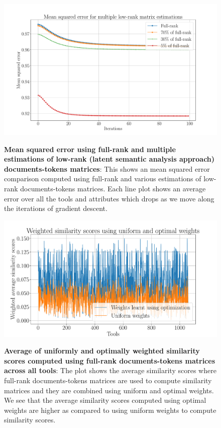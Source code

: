 \begin{figure}[h]
\begin{centering}
    {\includegraphics[scale=0.35]{figures/MSE_iterations_low_rank.pdf}}
    \caption[Mean squared error using full-rank and multiple estimations of low-rank (latent semantic analysis approach]{\textbf{Mean squared error using full-rank and multiple estimations of low-rank (latent semantic analysis approach) documents-tokens matrices}: This shows an mean squared error comparison computed using full-rank and various estimations of low-rank documents-tokens matrices. Each line plot shows an average error over all the tools and attributes which drops as we move along the iterations of gradient descent.}
\end{centering}
\end{figure}

\begin{figure}[h]
\begin{centering}
    {\includegraphics[scale=0.4]{figures/Optimization_100_lsi.pdf}}
    \caption[Average of uniformly and optimally weighted similarity scores computed using full-rank documents-tokens matrices across all tools]{\textbf{Average of uniformly and optimally weighted similarity scores computed using full-rank documents-tokens matrices across all tools}: The plot shows the average similarity scores where full-rank documents-tokens matrices are used to compute similarity matrices and they are combined using uniform and optimal weights. We see that the average similarity scores computed using optimal weights are higher as compared to using uniform weights to compute similarity scores. }
\end{centering}
\end{figure}


